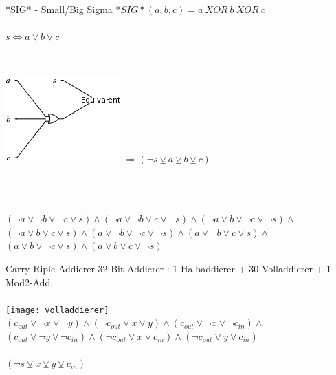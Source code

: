 \documentclass{beamer}
\begin{document}
    \begin{frame}{*SIG* - Small/Big Sigma}
      $ *SIG*(a, b, c) = a~XOR~b~XOR~c $\\
      ~\\
      $ s \Leftrightarrow a \veebar b \veebar c $\\
      ~\\      
      \begin{columns}[C]
        \includegraphics[scale=0.5]{sig.png}
        $ \Rightarrow (\neg s \veebar a \veebar b \veebar c) $
      \end{columns}
      ~\\
      ~\\
      $ (\neg a \vee \neg b \vee \neg c \vee s) \wedge (\neg a \vee \neg b \vee c \vee \neg s) \wedge (\neg a \vee b \vee \neg c \vee \neg s) \wedge$\\
      $ (\neg a \vee b \vee c \vee s) \wedge (a \vee \neg b \vee \neg c \vee \neg s) \wedge (a \vee \neg b \vee c \vee s) \wedge $\\
      $ (a \vee b \vee \neg c \vee s) \wedge (a \vee b \vee c \vee \neg s) $
    \end{frame}
    \begin{frame}{Carry-Riple-Addierer}
      32 Bit Addierer : 1 Halbaddierer + 30 Volladdierer + 1 Mod2-Add.\\
      ~\\
      \texttt{[image: volladdierer]}\\
      $ (c_{out} \vee \neg x \vee \neg y) \wedge (\neg c_{out} \vee x \vee y) \wedge (c_{out} \vee \neg x \vee \neg c_{in}) \wedge $\\
      $ (c_{out} \vee \neg y \vee \neg c_{in}) \wedge (\neg c_{out} \vee x \vee c_{in}) \wedge (\neg c_{out} \vee y \vee c_{in}) $\\
      ~\\
      $ (\neg s \veebar x \veebar y \veebar c_{in})$\\
    \end{frame}
\end{document}
